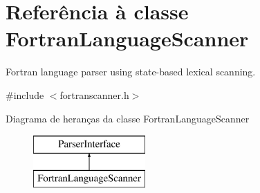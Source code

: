 \hypertarget{class_fortran_language_scanner}{\section{Referência à classe Fortran\-Language\-Scanner}
\label{class_fortran_language_scanner}
}


Fortran language parser using state-\/based lexical scanning.  




{\ttfamily \#include $<$fortranscanner.\-h$>$}

Diagrama de heranças da classe Fortran\-Language\-Scanner\begin{figure}[H]
\begin{center}
\leavevmode
\includegraphics[height=2.000000cm]{class_fortran_language_scanner}
\end{center}
\end{figure}
